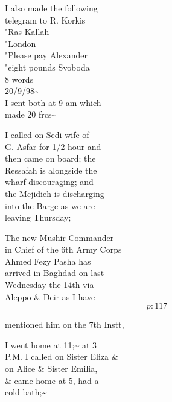 \documentclass{report}
\begin{document}

	\par{
 	I also made the following\ \\telegram to R. Korkis\ \\"Ras Kallah\ \\"London\ \\"Please pay Alexander\ \\"eight pounds Svoboda\ \\8 words\ \\20/9/98\~{}\ \\I sent both at 9 am which\ \\made 20 frcs\~{}\ \\
	}

	\par{
 	I called on Sedi wife of\ \\G. Asfar for 1/2 hour and\ \\then came on board; the\ \\Ressafah is alongside the\ \\wharf discouraging; and\ \\the Mejidieh is discharging\ \\into the Barge as we are\ \\leaving Thursday;\ \\
	}

	\par{
 	The new Mushir Commander\ \\in Chief of the 6th Army Corps\ \\Ahmed Fezy Pasha has\ \\arrived in Baghdad on last\ \\Wednesday the 14th via\ \\Aleppo \& Deir as I have\ \\
  \[p: 117 \]

	}






	\par{
 	mentioned him on the 7th Instt,\ \\
	}

	\par{
 	I went home at 11;\~{} at 3\ \\P.M. I called on Sister Eliza \&\ \\on Alice \& Sister Emilia,\ \\\& came home at 5, had a\ \\cold bath;\~{}\ \\
	}
\end{document}
